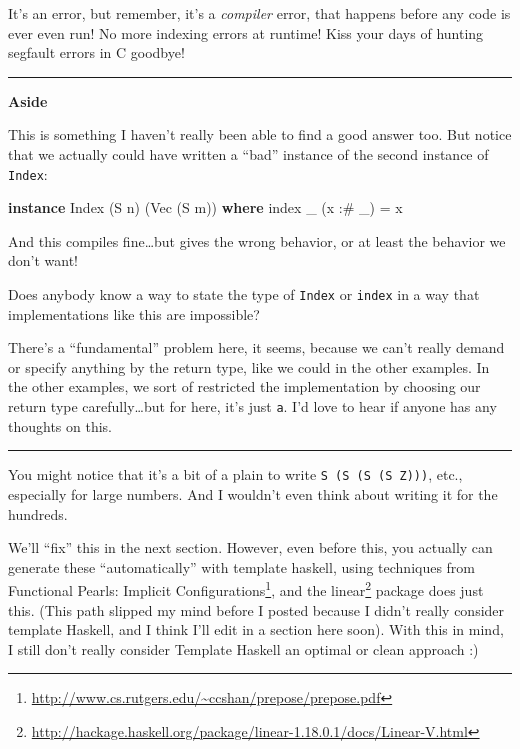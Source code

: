 \documentclass[]{article}
\newenvironment{Shaded}{}{}
\newcommand{\DataTypeTok}[1]{\textcolor[rgb]{0.56,0.13,0.00}{#1}}
\newcommand{\FunctionTok}[1]{\textcolor[rgb]{0.02,0.16,0.49}{#1}}
\newcommand{\KeywordTok}[1]{\textcolor[rgb]{0.00,0.44,0.13}{\textbf{#1}}}
\newcommand{\NormalTok}[1]{#1}
\newcommand{\OperatorTok}[1]{\textcolor[rgb]{0.40,0.40,0.40}{#1}}
\newcommand{\OtherTok}[1]{\textcolor[rgb]{0.00,0.44,0.13}{#1}}
\renewcommand{\href}[2]{#2\footnote{\url{#1}}}
\begin{document}
It's an error, but remember, it's a \emph{compiler} error, that happens before
any code is ever even run! No more indexing errors at runtime! Kiss your days of
hunting segfault errors in C goodbye!

\begin{center}\rule{0.5\linewidth}{\linethickness}\end{center}

\textbf{Aside}

This is something I haven't really been able to find a good answer too. But
notice that we actually could have written a ``bad'' instance of the second
instance of \texttt{Index}:

\begin{Shaded}
\begin{Highlighting}[]
\KeywordTok{instance} \DataTypeTok{Index}\NormalTok{ (}\DataTypeTok{S}\NormalTok{ n) (}\DataTypeTok{Vec}\NormalTok{ (}\DataTypeTok{S}\NormalTok{ m)) }\KeywordTok{where}
    \FunctionTok{index}\NormalTok{ \_ (x }\OperatorTok{:\#}\NormalTok{ \_) }\OtherTok{=}\NormalTok{ x}
\end{Highlighting}
\end{Shaded}

And this compiles fine\ldots but gives the wrong behavior, or at least the
behavior we don't want!

Does anybody know a way to state the type of \texttt{Index} or \texttt{index} in
a way that implementations like this are impossible?

There's a ``fundamental'' problem here, it seems, because we can't really demand
or specify anything by the return type, like we could in the other examples. In
the other examples, we sort of restricted the implementation by choosing our
return type carefully\ldots but for here, it's just \texttt{a}. I'd love to hear
if anyone has any thoughts on this.

\begin{center}\rule{0.5\linewidth}{\linethickness}\end{center}

You might notice that it's a bit of a plain to write
\texttt{S\ (S\ (S\ (S\ Z)))}, etc., especially for large numbers. And I wouldn't
even think about writing it for the hundreds.

We'll ``fix'' this in the next section. However, even before this, you actually
can generate these ``automatically'' with template haskell, using techniques
from \href{http://www.cs.rutgers.edu/~ccshan/prepose/prepose.pdf}{Functional
Pearls: Implicit Configurations}, and the
\href{http://hackage.haskell.org/package/linear-1.18.0.1/docs/Linear-V.html}{linear}
package does just this. (This path slipped my mind before I posted because I
didn't really consider template Haskell, and I think I'll edit in a section here
soon). With this in mind, I still don't really consider Template Haskell an
optimal or clean approach :)
\end{document}
